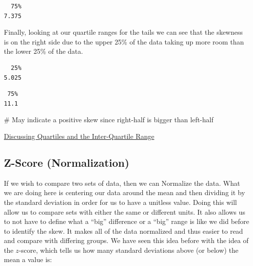 \documentclass[
  letterpaper,
  DIV=11,
  numbers=noendperiod]{scrreprt}
\newenvironment{Shaded}{\begin{snugshade}}{\end{snugshade}}
\newcommand{\CommentTok}[1]{\textcolor[rgb]{0.37,0.37,0.37}{#1}}
\newcommand{\DecValTok}[1]{\textcolor[rgb]{0.68,0.00,0.00}{#1}}
\newcommand{\FunctionTok}[1]{\textcolor[rgb]{0.28,0.35,0.67}{#1}}
\newcommand{\NormalTok}[1]{\textcolor[rgb]{0.00,0.23,0.31}{#1}}
\newcommand{\SpecialCharTok}[1]{\textcolor[rgb]{0.37,0.37,0.37}{#1}}
\begin{document}
\begin{verbatim}
  75% 
7.375 
\end{verbatim}

Finally, looking at our quartile ranges for the tails we can see that
the skewness is on the right side due to the upper 25\% of the data
taking up more room than the lower 25\% of the data.

\begin{Shaded}
\end{Shaded}

\begin{verbatim}
  25% 
5.025 
\end{verbatim}

\begin{Shaded}
\end{Shaded}

\begin{verbatim}
 75% 
11.1 
\end{verbatim}

\begin{Shaded}
\begin{Highlighting}[]
\CommentTok{\# May indicate a positive skew since right{-}half is bigger than left{-}half}
\end{Highlighting}
\end{Shaded}

\begin{watch}{}{}
    \href{https://youtu.be/5GPioBqp2Og}{Discussing Quartiles and the Inter-Quartile Range}
\end{watch}

\subsection{Z-Score (Normalization)}\label{z-score-normalization}

If we wish to compare two sets of data, then we can Normalize the data.
What we are doing here is centering our data around the mean and then
dividing it by the standard deviation in order for us to have a unitless
value. Doing this will allow us to compare sets with either the same or
different units. It also allows us to not have to define what a ``big''
difference or a ``big'' range is like we did before to identify the
skew. It makes all of the data normalized and thus easier to read and
compare with differing groups. We have seen this idea before with the
idea of the \(z\)-score, which tells us how many standard deviations
above (or below) the mean a value is:
\end{document}
